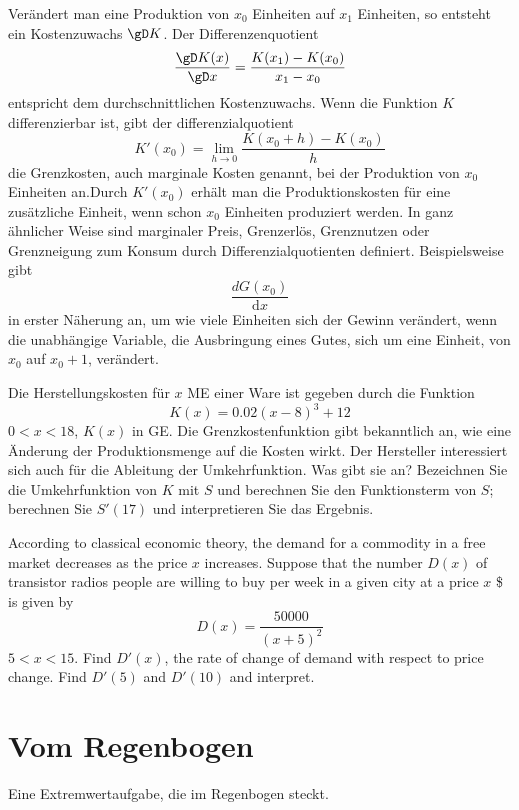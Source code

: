 \documentclass[%
11pt,%
twoside,%
titlepage,%
german,%
headsepline%
]{scrartcl}
\begin{document}
Ver\"andert man eine Produktion von $x_0$ Einheiten auf $x_1$ Einheiten, so entsteht ein Kostenzuwachs $\gD K$. Der Differenzenquotient
$$\frac{\gD K(x)}{\gD x}=\frac{K(x_1)-K(x_0)}{x_1-x_0}$$
entspricht dem durchschnittlichen Kostenzuwachs.
Wenn die Funktion $K$ differenzierbar ist, gibt der differenzialquotient
$$K'(x_0)=\lim_{h\to0}\frac{K(x_0+h)-K(x_0)}{h}$$
die Grenzkosten, auch marginale Kosten genannt, bei der Produktion von $x_0$ Einheiten an.Durch $K'(x_0)$ erh\"alt man die Produktionskosten f\"ur eine zus\"atzliche Einheit, wenn schon $x_0$ Einheiten produziert werden.
In ganz \"ahnlicher Weise sind marginaler Preis, Grenzerl\"os, Grenznutzen oder Grenzneigung zum Konsum durch Differenzialquotienten definiert. Beispielsweise gibt
$$\frac{dG(x_0)}{\mathrm{d}x}$$
in erster N\"aherung an, um wie viele Einheiten sich der Gewinn ver\"andert, wenn die unabh\"angige Variable, die Ausbringung eines Gutes, sich um eine Einheit, von $x_0$ auf $x_0 + 1$, ver\"andert.

\begin{ueb}
Die Herstellungskosten f\"ur $x$ ME einer Ware ist
gegeben durch die Funktion
$$K(x)=0.02(x-8)^3+12$$
$0<x<18$, $K(x)$ in GE. Die Grenzkostenfunktion gibt bekanntlich an, wie eine \"Anderung der Produktionsmenge auf die Kosten wirkt. Der Hersteller interessiert sich auch f\"ur die Ableitung der Umkehrfunktion. Was gibt sie an? Bezeichnen Sie die Umkehrfunktion von $K$ mit $S$ und berechnen Sie den Funktionsterm von $S$; berechnen Sie $S'(17)$ und interpretieren Sie das Ergebnis.
\end{ueb}

\begin{ueb}
According to classical economic theory, the demand for a commodity in a free market decreases as the price $x$ increases. Suppose that the number $D(x)$ of transistor radios people are willing to buy per week in a given city at a price $x$ \$ is given by
$$D(x)=\frac{50000}{(x+5)^2}$$
$5<x<15$. Find $D'(x)$, the rate of change of demand with
respect to price change. Find $D'(5)$ and $D'(10)$ and interpret.
\end{ueb}



\clearpage

\section{Vom Regenbogen}
Eine Extremwertaufgabe, die im Regenbogen steckt.

\cleardoublepage
\listoffigures
\listoftables
%
%
\end{document}
